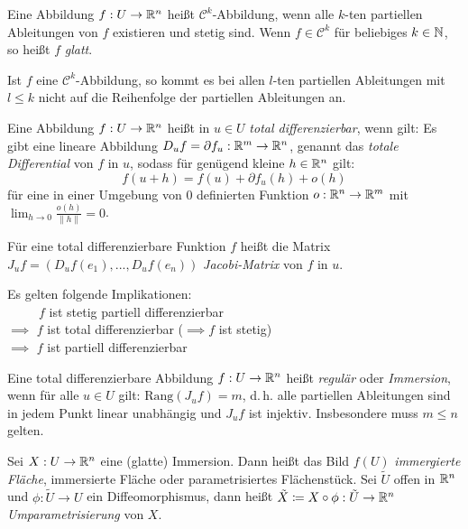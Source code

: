 \documentclass{cheat-sheet}
\begin{document}
\begin{defn}
  Eine Abbildung $f : U \to \mathbb{R}^n$ heißt $\mathcal{C}^k$-Abbildung, wenn alle $k$-ten partiellen Ableitungen von $f$ existieren und stetig sind. Wenn $f \in \mathcal{C}^k$ für beliebiges $k \in \mathbb{N}$, so heißt $f$ \emph{glatt}.
\end{defn}

\begin{satz}[Schwarz]
  Ist $f$ eine $\mathcal{C}^k$-Abbildung, so kommt es bei allen $l$-ten partiellen Ableitungen mit $l \leq k$ nicht auf die Reihenfolge der partiellen Ableitungen an.
\end{satz}

\begin{defn}
  Eine Abbildung $f : U \to \mathbb{R}^n$ heißt in $u \in U$ \emph{total differenzierbar}, wenn gilt: Es gibt eine lineare Abbildung $D_u f = \partial f_u : \mathbb{R}^m \to \mathbb{R}^n$, genannt das \emph{totale Differential} von $f$ in $u$, sodass für genügend kleine $h \in \mathbb{R}^n$ gilt:
  \[ f(u + h) = f(u) + \partial f_u(h) + o(h) \]
  für eine in einer Umgebung von $0$ definierten Funktion $o : \mathbb{R}^n \to \mathbb{R}^m$ mit $\lim_{h \to 0} \tfrac{o(h)}{\| h \|} = 0$.
\end{defn}

\begin{defn}
  Für eine total differenzierbare Funktion $f$ heißt die Matrix $J_u f = (D_u f(e_1), ..., D_u f(e_n))$ \emph{Jacobi-Matrix} von $f$ in $u$.
\end{defn}

\begin{bem}
Es gelten folgende Implikationen:\\
$\quad\quad\,\,\, f$ ist stetig partiell differenzierbar\\
$\implies$ $f$ ist total differenzierbar ($\!\implies f$ ist stetig)\\
$\implies$ $f$ ist partiell differenzierbar
\end{bem}


\begin{defn}
  Eine total differenzierbare Abbildung $f : U \to \mathbb{R}^n$ heißt \emph{regulär} oder \emph{Immersion}, wenn für alle $u \in U$ gilt: $\mathrm{Rang}(J_u f) = m$, d.\,h. alle partiellen Ableitungen sind in jedem Punkt linear unabhängig und $J_u f$ ist injektiv. Insbesondere muss $m \leq n$ gelten.
\end{defn}

\begin{defn}
  Sei $X : U \to \mathbb{R}^n$ eine (glatte) Immersion. Dann heißt das Bild $f(U)$ \emph{immergierte Fläche}, immersierte Fläche oder parametrisiertes Flächenstück. Sei $\tilde{U}$ offen in $\mathbb{R}^n$ und $\phi : \tilde{U} \to U$ ein Diffeomorphismus, dann heißt $\tilde{X} \coloneqq X \circ \phi : \tilde{U} \to \mathbb{R}^n$ \emph{Umparametrisierung} von $X$.
\end{defn}
\end{document}
